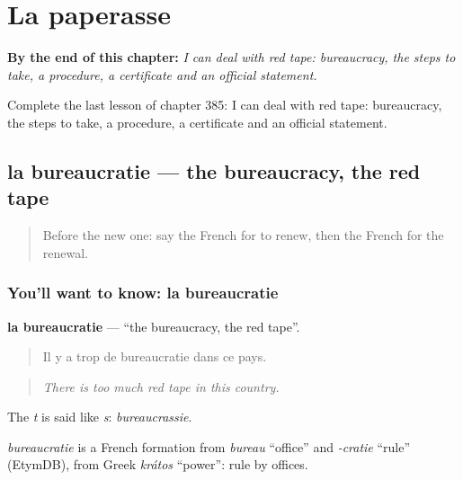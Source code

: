 
\chapter{La paperasse}
\label{ch:fr-la-paperasse}

\begin{chapteropening}
\textbf{By the end of this chapter:} \emph{I can deal with red tape: bureaucracy, the steps to take, a procedure, a certificate and an official statement.}

Complete the last lesson of chapter 385: I can deal with red tape: bureaucracy, the steps to take, a procedure, a certificate and an official statement.
\end{chapteropening}

\section[la bureaucratie]{la bureaucratie — the bureaucracy, the red tape}

\label{lesson:FR-C385-bureaucratie}



\begin{quote}
Before the new one: say the French for to renew, then the French for the renewal.
\end{quote}

\subsection*{You'll want to know: la bureaucratie}
\textbf{la bureaucratie} — \textquotedblleft{}the bureaucracy, the red tape\textquotedblright{}.

\begin{quote}
Il y a trop de bureaucratie dans ce pays.
\end{quote}

\begin{quote}
\emph{There is too much red tape in this country.}
\end{quote}

The \emph{t} is said like \emph{s}: \emph{bureaucrassie}.

\begin{cousinweb}
\emph{bureaucratie} is a French formation from \emph{bureau} \textquotedblleft{}office\textquotedblright{} and \emph{-cratie} \textquotedblleft{}rule\textquotedblright{} (EtymDB), from Greek \emph{krátos} \textquotedblleft{}power\textquotedblright{}: rule by offices.
\end{cousinweb}

